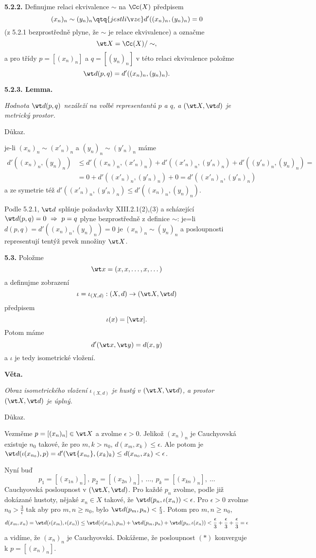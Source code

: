 \documentclass[12pt]{article}
\begin{document}
\medskip

{\bf 5.2.2.} Definujme relaci ekvivalence $\sim$ na $\Cc(X)$ předpisem
$$
(x_n)_n\sim(y_n)_n\qtq{jestli\v ze} d'((x_n)_n,(y_n)_n)=0
$$
(z 5.2.1 bezprostředně plyne, že  $\sim$ je relace ekvivalence) a
označme
$$
\wt X=\Cc(X)/\sim,
$$
 a pro třídy $p=[(x_n)_n]$ a $q=[(y_n)_n]$ v této relaci ekvivalence položme
$$
\wt d(p,q)=d'((x_n)_n,(y_n)_n).
$$

\medskip

{\bf 5.2.3. Lemma.} {\em Hodnota $\wt d(p,q)$ nezáleží na volbě representantů  $p$ a $q$, a $(\wt X,\wt d)$ je metrický  prostor.

Důkaz.} je-li $(x_n)_n\sim(x'_n)_n$ a $(y_n)_n\sim(y'_n)_n$ máme
$$
\begin{aligned}
 d'((x_n)_n,(y_n)_n)&\leq d'((x_n)_n,(x'_n)_n)+ d'((x'_n)_n,(y'_n)_n)+ d'((y'_n)_n,(y_n)_n)=\\
  &=0+d'((x'_n)_n,(y'_n)_n)+0= d'((x'_n)_n,(y'_n)_n)
  \end{aligned}
 $$
 a ze symetrie též $ d'((x'_n)_n,(y'_n)_n) \leq d'((x_n)_n,(y_n)_n)$.
 
 Podle  5.2.1, $\wt d$ splňuje požadavky XIII.2.1(2),(3) a scházející $\wt d(p,q)=0\ \Rightarrow\ p=q$ plyne bezprostředně z definice
  $\sim$: je=li $d(p,q)=d'((x_n)_n,(y_n)_n)=0$ je $(x_n)_n\sim(y_n)_n$ a posloupnosti representují tentýž prvek množiny $\wt X$.\sq
 
 \bigskip
 
 {\bf 5.3.} Položme
$$\wt x=(x,x,\dots,x,\dots)
$$
a definujme zobrazení
 $$
 \iota=\iota_{(X,d)}:(X,d)\to (\wt X,\wt d)
 $$
 předpisem
$$
\iota(x)=[\wt x].
$$
 Potom máme 
 $$
 d'(\wt x,\wt y)=d(x,y)
 $$
 a $\iota$ je tedy isometrické vložení.
 
 \medskip
 
 {\bf Věta.} {\em Obraz isometrického vložení $\iota_{(X,d)}$ je hustý v $(\wt X,\wt d)$, a prostor $(\wt X,\wt d)$ je úplný.
 
 Důkaz.} 
  Vezměme  $p=[(x_n)_n]\in\wt X$ a zvolme $\epsilon>0$. Jelikož $(x_n)_n$ je Cauchyovská existuje $n_0$ takové, že pro $m,k>n_0$, $d(x_m,x_k)\leq\epsilon$. Ale potom je $\wt d(\iota(x_{n_0}),p)=d'(\wt{x_{n_0}},(x_k)_k)\leq d(x_{n_0},x_k)<\epsilon$.
 
 \smallskip
 
 Nyní buď
 \begin{equation}
 p_1 =[(x_{1n})_n],\  p_2 =[(x_{2n})_n],\ \dots,\  p_k =[(x_{kn})_n],\  \dots \tag{$*$}
 \end{equation}
Cauchyovská posloupnost v $(\wt X,\wt d)$.  Pro každé $p_n$ zvolme, podle již dokázané hustoty, nějaké $x_n\in X$ takové, že
 $\wt d(p_n,\iota(x_n))<\epsilon$. Pro  $\epsilon>0$ zvolme $n_0>\frac{3}{\epsilon}$ tak aby pro $m,n\geq n_0$, 
 bylo $\wt d(p_m,p_n)<\frac{\epsilon}{3}$. Potom pro $m,n\geq n_0$,
 $$
 d(x_m,x_n)=\wt d(\iota(x_m),\iota(x_n))\leq\wt d(\iota(x_m),p_m)+\wt d(p_m,p_n)+\wt d(p_n,\iota(x_n))<\frac{\epsilon}{3}+\frac{\epsilon}{3}+\frac{\epsilon}{3}=\epsilon
 $$
a vidíme, že $(x_n)_n$ je Cauchyovská. Dokážeme, že posloupnost $(*)$ konverguje k $p=[(x_n)_n]$. 
 
\end{document}
